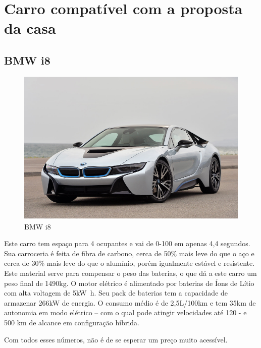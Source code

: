 \section{Carro compatível com a proposta da casa}
\subsection{BMW i8}

\begin{figure}[H]
\begin{center}
\includegraphics[keepaspectratio,scale=0.8]{figuras/bmwi8.jpg.eps}
\caption{BMW i8}
\end{center}
\end{figure}

Este carro tem espaço para 4 ocupantes e vai de 0-100 \nicefrac{\si{\kilo\meter}}{\si{\hour}} em apenas 4,4 segundos. Sua carroceria é feita de fibra de carbono, cerca de 50\% mais leve do que o aço e cerca de 30\% mais leve do que o alumínio, porém igualmente estável e resistente. Este material serve para compensar o peso das baterias, o que dá a este carro um peso final de 1490\si{\kilo\gram}. O motor elétrico é alimentado por baterias de Íons de Lítio com alta voltagem de 5\si{\kilo\watt\hour}. Seu pack de baterias tem a capacidade de armazenar 266\si{\kilo\watt} de energia. O consumo médio é de 2,5\si{\liter}/100\si{\kilo\meter} e tem 35\si{\kilo\meter} de autonomia em modo elétrico – com o qual pode atingir velocidades até 120\nicefrac{\si{\kilo\meter}}{\si{\hour}} - e 500 \si{\kilo\meter} de alcance em configuração híbrida.

Com todos esses números, não é de se esperar um preço muito acessível.

